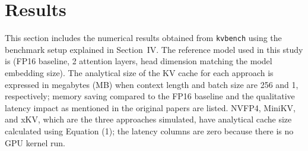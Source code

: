 \documentclass[conference]{IEEEtran}
\begin{document}
\section{Results}
\label{sec:results}

This section includes the numerical results obtained from \texttt{kvbench} using the benchmark setup explained in Section~IV. The reference model used in this study is  (FP16 baseline, 2 attention layers, head dimension matching the model embedding size). The analytical size of the KV cache for each approach is expressed in megabytes (MB) when context length and batch size are 256 and 1, respectively; memory saving compared to the FP16 baseline and the qualitative latency impact as mentioned in the original papers are listed. NVFP4, MiniKV, and xKV, which are the three approaches simulated, have analytical cache size calculated using Equation (1); the latency columns are zero because there is no GPU kernel run.
\end{document}
